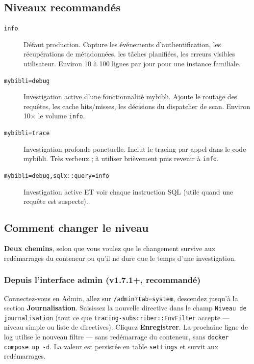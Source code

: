 \subsection*{Niveaux recommandés}

\begin{description}
  \item[\texttt{info}] Défaut production. Capture les événements
        d'authentification, les récupérations de métadonnées, les
        tâches planifiées, les erreurs visibles utilisateur. Environ
        10 à 100 lignes par jour pour une instance familiale.
  \item[\texttt{mybibli=debug}] Investigation active d'une
        fonctionnalité mybibli. Ajoute le routage des requêtes, les
        cache hits/misses, les décisions du dispatcher de scan.
        Environ 10$\times$ le volume \texttt{info}.
  \item[\texttt{mybibli=trace}] Investigation profonde ponctuelle.
        Inclut le tracing par appel dans le code mybibli. Très
        verbeux ; à utiliser brièvement puis revenir à
        \texttt{info}.
  \item[\texttt{mybibli=debug,sqlx::query=info}] Investigation active
        ET voir chaque instruction SQL (utile quand une requête est
        suspecte).
\end{description}

\subsection*{Comment changer le niveau}

\textbf{Deux chemins}, selon que vous voulez que le changement
survive aux redémarrages du conteneur ou qu'il ne dure que le
temps d'une investigation.

\subsubsection*{Depuis l'interface admin (v1.7.1+, recommandé)}

Connectez-vous en Admin, allez sur \texttt{/admin?tab=system},
descendez jusqu'à la section \textbf{Journalisation}. Saisissez la
nouvelle directive dans le champ \texttt{Niveau de journalisation}
(tout ce que \texttt{tracing-subscriber::EnvFilter} accepte
\string— niveau simple ou liste de directives). Cliquez
\textbf{Enregistrer}. La prochaine ligne de log utilise le nouveau
filtre \string— sans redémarrage du conteneur, sans
\texttt{docker compose up -d}. La valeur est persistée en table
\texttt{settings} et survit aux redémarrages.

